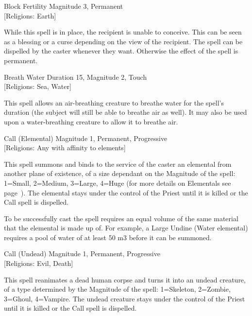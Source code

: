 \begin{samepage}
\begin{rpg-spell}
{Block Fertility}
{Magnitude 3, Permanent\\{[Religions: Earth]}}

While this spell is in place, the recipient is unable to conceive. This can be seen as a blessing or a curse depending on the view of the recipient. The spell can be dispelled by the caster whenever they want. Otherwise the effect of the spell is permanent. 
\end{rpg-spell}
\end{samepage}

\begin{samepage}
\begin{rpg-spell}
{Breath Water}
{Duration 15, Magnitude 2, Touch\\{[Religions: Sea, Water]}}

This spell allows an air-breathing creature to breathe water for the spell’s duration (the subject will still be able to breathe air as well). It may also be used upon a water-breathing creature to allow it to breathe air. 
\end{rpg-spell}
\end{samepage}

\begin{samepage}
\begin{rpg-spell}
{Call (Elemental)}
{Magnitude 1, Permanent, Progressive\\{[Religions: Any with affinity to elements]}}

This spell summons and binds to the service of the caster an elemental from another plane of existence, of a size dependant on the Magnitude of the spell:
1=Small, 2=Medium, 3=Large, 4=Huge (for more details on Elementals see page~\pageref{monster:elemental}). The elemental stays under the control of the Priest until it is killed or the Call spell is dispelled. 
	
To be successfully cast the spell requires an equal volume of the same material that the elemental is made up of. For example, a Large Undine (Water elemental) requires a pool of water of at least 50 m3 before it can be summoned.
\end{rpg-spell}
\end{samepage}

\begin{samepage}
\begin{rpg-spell}
{Call (Undead)}
{Magnitude 1, Permanent, Progressive\\{[Religions: Evil, Death]}}

This spell reanimates a dead human corpse and turns it into an undead creature, of a type determined by the Magnitude of the spell:
1=Skeleton, 2=Zombie, 3=Ghoul, 4=Vampire. The undead creature stays under the control of the Priest until it is killed or the Call spell is dispelled.
\end{rpg-spell}
\end{samepage}

